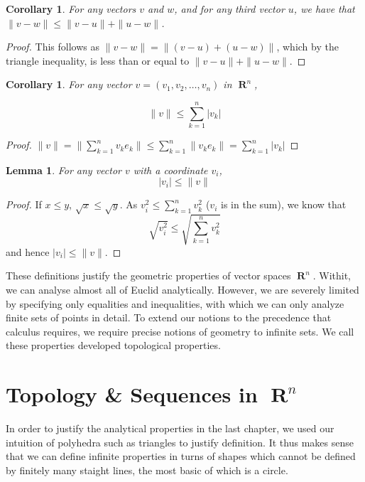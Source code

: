 \documentclass{report}
\newtheorem{lemma}[theorem]{Lemma}
\newtheorem{corollary}[theorem]{Corollary}
\DeclareMathOperator{\real}{\mathbf{R}}
\begin{document}
\begin{corollary}
  For any vectors $v$ and $w$, and for any third vector $u$, we have that $\|v - w\| \leq \|v - u\| + \|u - w\|$.
\end{corollary}
\begin{proof}
  This follows as $\| v - w \| = \| (v - u) + (u - w) \|$, which by the triangle inequality, is less than or equal to $\| v - u \| + \| u - w \|$.
\end{proof}

\begin{corollary}
  For any vector $v = (v_1, v_2, \dots, v_n)$ in $\real^n$,

  \[ \|v\| \leq \sum_{k = 1}^n |v_k| \]
\end{corollary}
\begin{proof}
  $\| v \| = \| \sum_{k = 1}^n v_k e_k \| \leq \sum_{k = 1}^n \| v_k e_k \| = \sum_{k = 1}^n | v_k |$
\end{proof}

\begin{lemma}
  For any vector $v$ with a coordinate $v_i$,
  \[ |v_i| \leq \| v \| \]
\end{lemma}
\begin{proof}
  If $x \leq y$, $\sqrt{x} \leq \sqrt{y}$. As $v_i^2 \leq \sum_{k=1}^n v_k^2$ ($v_i$ is in the sum), we know that
  \[ \sqrt{v_i^2} \leq \sqrt{\sum_{k=1}^n v_k^2} \]
  and hence $|v_i| \leq \| v \|$.
\end{proof}

These definitions justify the geometric properties of vector spaces $\real^n$. Withit, we can analyse almost all of Euclid analytically. However, we are severely limited by specifying only equalities and inequalities, with which we can only analyze finite sets of points in detail. To extend our notions to the precedence that calculus requires, we require precise notions of geometry to infinite sets. We call these properties developed topological properties.










\chapter{Topology \& Sequences in $\real^n$}

In order to justify the analytical properties in the last chapter, we used our intuition of polyhedra such as triangles to justify definition. It thus makes sense that we can define infinite properties in turns of shapes which cannot be defined by finitely many staight lines, the most basic of which is a circle.
\end{document}
